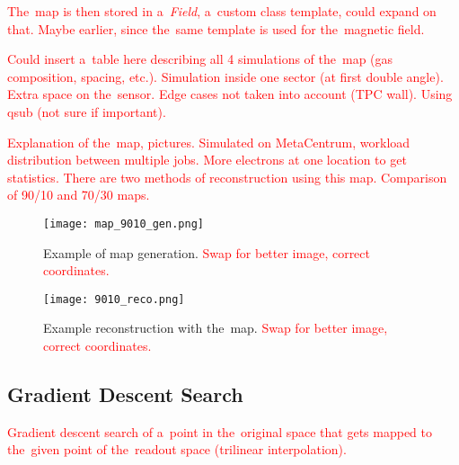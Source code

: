 		\textcolor{red}{The~map is then stored in a~\textit{Field}, a~custom class template, could expand on that. Maybe earlier, since the~same template is used for the~magnetic field.}
		
		\textcolor{red}{Could insert a~table here describing all 4 simulations of the~map (gas composition, spacing, etc.). Simulation inside one sector (at first double angle). Extra space on the~sensor. Edge cases not taken into account (TPC wall). Using qsub (not sure if important).}
		
		\textcolor{red}{Explanation of the~map, pictures. Simulated on MetaCentrum, workload distribution between multiple jobs. More electrons at one location to get statistics. There are two methods of reconstruction using this map. Comparison of 90/10 and 70/30 maps.}
		
		\begin{figure}
			\centering
			\texttt{[image: map\_9010\_gen.png]}
			\caption{Example of map generation. \textcolor{red}{Swap for better image, correct coordinates.}}
			\label{fig:map9010gen}
		\end{figure}
		
		\begin{figure}
			\centering
			\texttt{[image: 9010\_reco.png]}
			\caption{Example reconstruction with the~map. \textcolor{red}{Swap for better image, correct coordinates.}}
			\label{fig:9010reco}
		\end{figure}
		
		\subsection{Gradient Descent Search}
			\label{sec:grad}
			\textcolor{red}{Gradient descent search of a~point in the~original space that gets mapped to the~given point of the~readout space (trilinear interpolation).}
			
